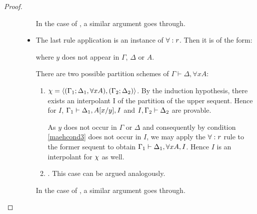 \begin{proof}
\begin{description}
\begin{itemize}
					In the case of , a similar argument goes through.

				\item The last rule application is an instance of $\operatorname{\forall}:r$. Then it is of the form:\nopagebreak
					\begin{prooftree}
					\end{prooftree}
					where $y$ does not appear in $\Gamma$, $\Delta$ or $A$.

					There are two possible partition schemes of $\Gamma\vdash \Delta, \forall x A $:
					\begin{enumerate}
						\item $\chi =  \langle (\Gamma_1; \Delta_1, \forall x A),\allowbreak (\Gamma_2; \Delta_2)\rangle $.
							By the induction hypothesis, there exists an interpolant I of the partition 
							 of the upper sequent.
							Hence for $I$, 
							$\Gamma_1 \vdash \Delta_1, A[x/y], I$ and
							$I, \Gamma_2 \vdash \Delta_2$ are provable.

						As $y$ does not occur in $\Gamma$ or $\Delta$ and consequently by condition \ref{maehcond3} does not occur in $I$, we may apply the $\operatorname{\forall}:r$ rule to the former sequent to obtain $\Gamma_1 \vdash \Delta_1, \forall x A, I$.
							Hence $I$ is an interpolant for $\chi$ as well.

						\item \parti{\Gamma_1}{\Delta_1}{\Gamma_2}{\Delta_2, \forall x A}.
							This case can be argued analogously.
					\end{enumerate}

					In the case of , a similar argument goes through.
					\qedhere
			\end{itemize}
			\begin{comment} %
			\item[\normalfont Equality rules.]
				Suppose the property holds for $n$ rule applications and the $(n+1)$th rule is an equality rule.

				\begin{itemize}
					\item The last rule application is an instance of $\lkrule{=}{r_1}$. Then it is of the form:
						\begin{prooftree}
							\Axiomm{\Gamma\fCenter \Delta, A\subst{T/t} }
							\Axiomm{\Sigma \fCenter \Pi, s=t}
							\RightLabelm{\lkrule{=}{r_1}}
							\BinaryInfm{\Gamma, \Sigma\fCenter \Delta, \Pi, A\subst{T/s}  }
						\end{prooftree}


\end{comment}
\end{description}
\end{proof}
